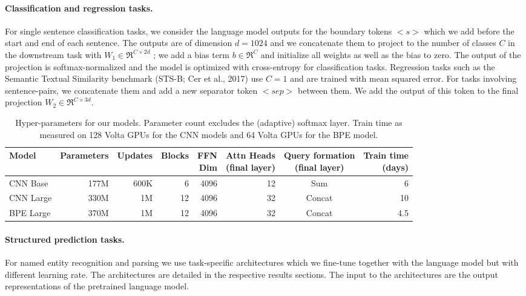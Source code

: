 \documentclass[11pt,a4paper]{article}
\begin{document}
\paragraph{Classification and regression tasks.}
For single sentence classification tasks, we consider the language model outputs for the boundary tokens $<s>$ which we add before the start and end of each sentence.
The outputs are of dimension $d=1024$ and we concatenate them to project to the number of classes $C$ in the downstream task with $W_{1} \in \Re^{C \times 2d}$ \citep{radford2018unsup};
we add a bias term $b \in \Re^C$ and initialize all weights as well as the bias to zero.
The output of the projection is softmax-normalized and the model is optimized with cross-entropy for classification tasks. 
Regression tasks such as the Semantic Textual Similarity benchmark (STS-B; Cer et al., 2017)\nocite{cer2017stsb} use $C=1$ and are trained with mean squared error.
For tasks involving sentence-pairs, we concatenate them and add a new separator token $<sep>$ between them. 
We add the output of this token to the final projection $W_{2} \in \Re^{C \times 3d}$.

\begin{table}[t]
\centering
\begin{tabular}{lrrrrrcr}
\toprule
\bf Model & \bf Parameters & \bf Updates & \bf Blocks & \bf \thead{FFN\\ Dim} & \bf \thead{Attn Heads\\ (final layer)} & \bf \thead{Query formation\\ (final layer)} & \bf \thead{Train time\\ (days)} \\ \midrule
CNN Base & 177M & 600K & 6 & 4096 & 12 & Sum & 6 \\
CNN Large & 330M & 1M & 12 & 4096 & 32 & Concat & 10 \\
BPE Large & 370M & 1M & 12 & 4096 & 32 & Concat & 4.5 \\
\bottomrule
\end{tabular}
\caption{Hyper-parameters for our models. Parameter count excludes the (adaptive) softmax layer. Train time as measured on 128 Volta GPUs for the CNN models and 64 Volta GPUs for the BPE model.}
\label{tab:model_params}
\end{table}


\paragraph{Structured prediction tasks.}
For named entity recognition and parsing we use task-specific architectures which we fine-tune together with the language model but with different learning rate.  
The architectures are detailed in the respective results sections.
The input to the architectures are the output representations of the pretrained language model.
\end{document}
